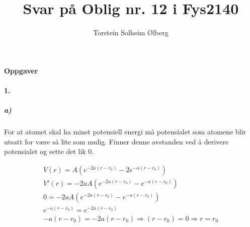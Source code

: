 \documentclass[11pt, A4paper,norsk]{article}
\author{Torstein Solheim Ølberg}
\title{Svar på Oblig nr. 12 i Fys2140}
\begin{document}
\maketitle
	\begin{center}
\Large \textbf{Oppgaver}
	\end{center}









		\paragraph{1.}
			\subparagraph{a)}
				\begin{flushleft}
For at atomet skal ha minst potensiell energi må potensialet som atomene blir utsatt for være så lite som mulig. Finner denne avstanden ved å derivere potensialet og sette det lik $0$.
				\end{flushleft}
				\begin{gather*}
V(r) = A \left( e^{- 2 a (r - r_0)} - 2 e^{- a (r - r_0)} \right) \\
V'(r) = - 2 a A \left( e^{- 2 a (r - r_0)} - e^{- a (r - r_0)} \right) \\
0 = - 2 a A \left( e^{- 2 a (r - r_0)} - e^{- a (r - r_0)} \right) \\
e^{- a (r - r_0)} = e^{- 2 a (r - r_0)} \\
- a (r - r_0) = - 2 a (r - r_0) \Rightarrow (r - r_0) = 0 \Rightarrow r = r_0
				\end{gather*}
\end{document}
